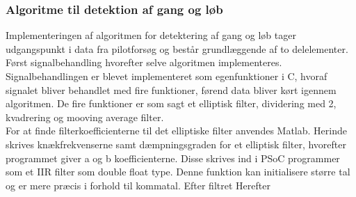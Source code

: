 \subsubsection{Algoritme til detektion af gang og løb}
Implementeringen af algoritmen for detektering af gang og løb tager udgangspunkt i data fra pilotforsøg og består grundlæggende af to delelementer. Først signalbehandling hvorefter selve algoritmen implementeres. Signalbehandlingen er blevet implementeret som egenfunktioner i C, hvoraf signalet bliver behandlet med fire funktioner, førend data bliver kørt igennem algoritmen. De fire funktioner er som sagt et elliptisk filter, dividering med 2, kvadrering og mooving average filter. \\
For at finde filterkoefficienterne til det elliptiske filter anvendes Matlab. Herinde skrives knækfrekvenserne samt dæmpningsgraden for et elliptisk filter, hvorefter programmet giver a og b koefficienterne. Disse skrives ind i PSoC programmer som et IIR filter som double float type. Denne funktion kan initialisere større tal og er mere præcis i forhold til kommatal. Efter filtret Herefter 


